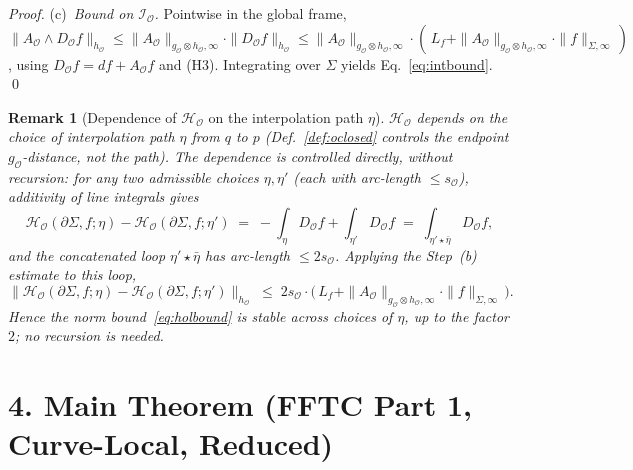 \documentclass[11pt]{article}
\newtheorem{remark}{Remark}
\newcommand{\sO}{s_{\mathcal{O}}}  %
\newcommand{\Obs}{\mathcal{O}}
\newcommand{\HolO}{\mathcal{H}_{\Obs}}
\newcommand{\IntO}{\mathcal{I}_{\Obs}}
\newcommand{\AO}{A_{\Obs}}
\newcommand{\gO}{g_{\Obs}}
\newcommand{\hO}{h_{\Obs}}
\newcommand{\DO}{D_{\Obs}}
\begin{document}
\begin{proof}
\smallskip
(c)~\emph{Bound on $\IntO$.} Pointwise in the global frame,
$\|\AO \wedge \DO f\|_{\hO}
\leq \|\AO\|_{\gO \otimes \hO, \infty} \cdot \|\DO f\|_{\hO}
\leq \|\AO\|_{\gO \otimes \hO, \infty} \cdot
(\, L_f + \|\AO\|_{\gO \otimes \hO, \infty} \cdot \|f\|_{\Sigma, \infty}\,)$,
using $\DO f = df + \AO f$ and (H3). Integrating over $\Sigma$ yields
Eq.~\eqref{eq:intbound}.
\qed
\end{proof}

\begin{remark}[Dependence of $\HolO$ on the interpolation path $\eta$]
\label{rem:holodep}
$\HolO$ depends on the choice of interpolation path $\eta$ from $q$
to $p$ (Def.~\ref{def:oclosed} controls the endpoint $\gO$-distance,
not the path). The dependence is controlled \emph{directly}, without
recursion: for any two admissible choices $\eta, \eta'$ (each with
arc-length $\leq \sO$), additivity of line integrals gives
\[
\HolO(\partial\Sigma, f; \eta) - \HolO(\partial\Sigma, f; \eta')
\;=\; -\int_\eta \DO f + \int_{\eta'} \DO f
\;=\; \int_{\eta' \star \bar\eta} \DO f,
\]
and the concatenated loop $\eta' \star \bar\eta$ has arc-length
$\leq 2\sO$. Applying the Step~(b) estimate to this loop,
\[
\|\HolO(\partial\Sigma, f; \eta) - \HolO(\partial\Sigma, f; \eta')\|_{\hO}
\;\leq\; 2\sO \cdot \big(\, L_f + \|\AO\|_{\gO \otimes \hO, \infty} \cdot \|f\|_{\Sigma, \infty}\,\big).
\]
Hence the norm bound~\eqref{eq:holbound} is stable across choices of
$\eta$, up to the factor $2$; no recursion is needed.
\end{remark}

\section*{4. Main Theorem (FFTC Part 1, Curve-Local, Reduced)}
\end{document}
